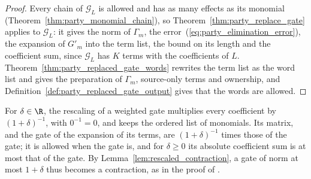 \begin{proof}\leanok
    Every chain of $\mathcal G_L$ is allowed and has as many effects as its monomial
    (Theorem~\ref{thm:party_monomial_chain}), so Theorem~\ref{thm:party_replace_gate}
    applies to $\mathcal G_L$: it gives the norm of $\Gamma_m$, the
    error~(\ref{eq:party_elimination_error}), the expansion of $G'_m$ into the term
    list, the bound on its length and the coefficient sum, since $\mathcal G_L$ has
    $K$ terms with the coefficients of $L$. Theorem~\ref{thm:party_replaced_gate_words}
    rewrites the term list as the word list and gives the preparation of
    $\Gamma_m$, source-only terms and ownership, and
    Definition~\ref{def:party_replaced_gate_output} gives that the words are
    allowed.
\end{proof}

\begin{definition}
    \label{def:party_rescale}
    \leanok
    For $\delta\in\R$, the rescaling of a weighted gate multiplies every coefficient
    by $(1+\delta)^{-1}$, with $0^{-1}=0$, and keeps the ordered list of monomials.
    Its matrix, and the gate of the expansion of its terms, are $(1+\delta)^{-1}$
    times those of the gate; it is allowed when the gate is, and for $\delta\ge0$
    its absolute coefficient sum is at most that of the gate. By
    Lemma~\ref{lem:rescaled_contraction}, a gate of norm at most $1+\delta$ thus
    becomes a contraction, as in the proof of
    \cite[Theorem~5.2]{OpenAI2026PolynomialPEPS}.
\end{definition}
